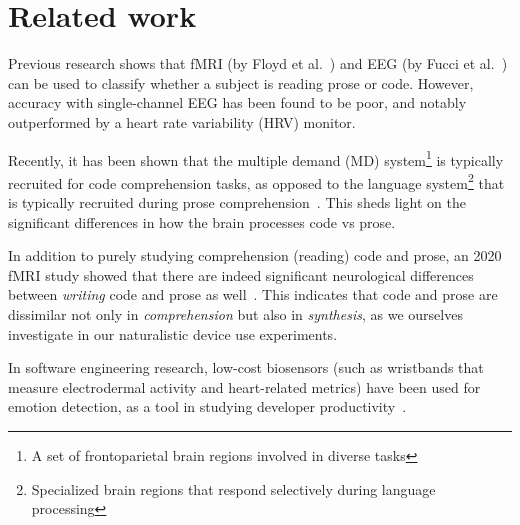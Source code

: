 \section{Related work}


    Previous research shows that fMRI (by Floyd et al.~\cite{floyd_decoding_2017}) and EEG (by Fucci et al.~\cite{fucci_replication_2019}) can be used to classify whether a subject is reading prose or code. However, accuracy with single-channel EEG has been found to be poor, and notably outperformed by a heart rate variability (HRV) monitor.

    Recently, it has been shown that the multiple demand (MD) system\footnote{A set of frontoparietal brain regions involved in diverse tasks} is typically recruited for code comprehension tasks, as opposed to the language system\footnote{Specialized brain regions that respond selectively during language processing} that is typically recruited during prose comprehension~\cite{ivanova_comprehension_2020}. This sheds light on the significant differences in how the brain processes code vs prose.

    In addition to purely studying comprehension (reading) code and prose, an 2020 fMRI study showed that there are indeed significant neurological differences between \emph{writing} code and prose as well~\cite{noauthor_neurological_nodate}. This indicates that code and prose are dissimilar not only in \emph{comprehension} but also in \emph{synthesis}, as we ourselves investigate in our naturalistic device use experiments.

    In software engineering research, low-cost biosensors (such as wristbands that measure electrodermal activity and heart-related metrics) have been used for emotion detection, as a tool in studying developer productivity~\cite{girardi_recognizing_2020}. 

